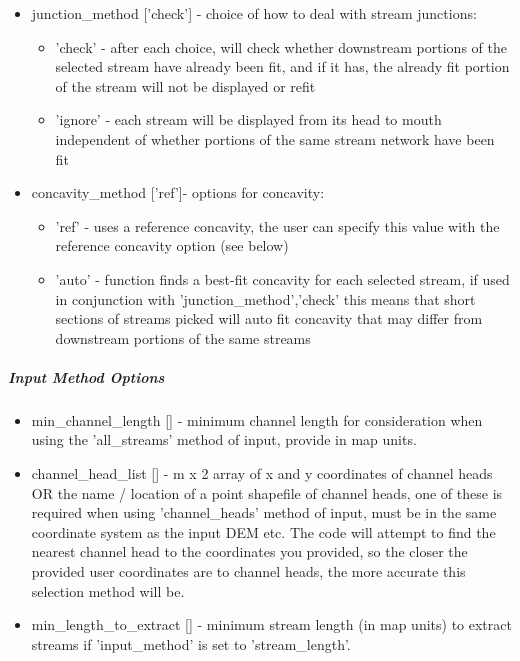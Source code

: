 \begin{itemize}
	\item junction\_method ['check'] - choice of how to deal with stream junctions:
	\begin{itemize}
		\item 'check' - after each choice, will check whether downstream portions of the selected stream have already been fit, and if it has,
		the already fit portion of the stream will not be displayed or refit
		\item 'ignore' - each stream will be displayed from its head to mouth independent of whether portions of the same stream network have 
		been fit
	\end{itemize}
	
	\item concavity\_method ['ref']- options for concavity:
	\begin{itemize}
		\item 'ref' - uses a reference concavity, the user can specify this value with the reference concavity option (see below)
		\item 'auto' - function finds a best-fit concavity for each selected stream, if used in conjunction with 'junction\_method','check'
		this means that short sections of streams picked will auto fit concavity that may differ from downstream portions of the same
		streams
	\end{itemize}
\end{itemize}


\subparagraph{Input Method Options }
\begin{itemize}
\item min\_channel\_length [] - minimum channel length for consideration when using the 'all\_streams' method of input, provide in map units.
\item channel\_head\_list [] - m x 2 array of x and y coordinates of channel heads OR the name / location of a point shapefile of channel heads, 
one of these is required when using 'channel\_heads' method of input, must be in the same coordinate system as the input DEM etc. 
The code will attempt to find the nearest channel head to the coordinates you provided, so the closer the provided user coordinates
are to channel heads, the more accurate this selection method will be.
\item min\_length\_to\_extract [] - minimum stream length (in map units) to extract streams if 'input\_method' is set to 'stream\_length'.
\end{itemize}

